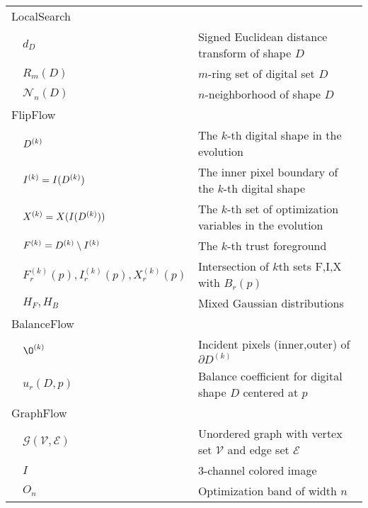 \begin{longtable}{p{1cm}ll}
\multicolumn{3}{l}{LocalSearch}\\
& $d_D$ & Signed Euclidean distance transform of shape $D$\\
& $R_m(D)$ & $m$-ring set of digital set $D$\\
& $\mathcal{N}_n(D)$ & $n$-neighborhood of shape $D$\\[1em]

\multicolumn{3}{l}{FlipFlow}\\
& $D^{(k)}$ & The $k$-th digital shape in the evolution\\
& $I^{(k)} = I(D^{(k)})$ & The inner pixel boundary of the $k$-th digital shape\\
& $X^{(k)} = X(I(D^{(k)}))$ & The $k$-th set of optimization variables in the evolution\\
& $F^{(k)} = D^{(k)} \setminus I^{(k)}$ & The $k$-th trust foreground \\
& $F_r^{(k)}(p),I_r^{(k)}(p),X_r^{(k)}(p)$ & Intersection of $k$th sets F,I,X with $B_r(p)$\\
& $H_F,H_B$ & Mixed Gaussian distributions\\[1em]

\multicolumn{3}{l}{BalanceFlow}\\
& $\O^{(k)}$ & Incident pixels (inner,outer) of $\partial D^{(k)}$\\
& $u_r(D,p)$ & Balance coefficient for digital shape $D$ centered at $p$\\[1em]

\multicolumn{3}{l}{GraphFlow}\\
& $\mathcal{G}(\mathcal{V},\mathcal{E})$ & Unordered graph with vertex set $\mathcal{V}$ and edge set $\mathcal{E}$ \\
& $I$ & $3$-channel colored image\\
& $O_n$ & Optimization band of width $n$\\


\end{longtable}
